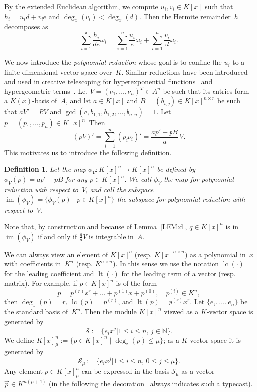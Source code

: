 \documentclass{sig-alternate-05-2015}
\newtheorem{defi}[theorem]{Definition}
\newcommand{\bN}{ {\mathbb N}}
\newcommand{\cS}{ {\mathcal S}}
\def\lc{\operatorname{lc}}
\def\lt{\operatorname{lt}}
\def\im{\operatorname{im}}
\begin{document}
By the extended Euclidean algorithm, we compute $u_i, v_i\in K[x]$ such that
$h_i = u_i d + v_i e$ and $\deg_x(v_i) < \deg_x(d)$. Then the Hermite remainder~$h$
decomposes as
\begin{equation}\label{EQ:h}
  \sum_{i=1}^n \frac{h_i}{de}\omega_i =  \sum_{i=1}^n \frac{u_i}{e}\omega_i + \sum_{i=1}^n \frac{v_i}{d}\omega_i.
\end{equation}

We now introduce the \emph{polynomial reduction} whose goal is to confine the $u_i$ to a finite-dimensional
vector space over~$K$. Similar reductions have been introduced and used in creative telescoping
for hyperexponential functions~\cite{bostan13a} and hypergeometric terms~\cite{chen15a}.
Let $V = (\nu_1, \ldots, \nu_n)^T\in A^n$ be such that its entries form a $K(x)$-basis of~$A$,
and let $a\in K[x]$ and $B = (b_{i, j})\in K[x]^{n \times n}$ be such that $aV'=BV$ and
$\gcd(a, b_{1, 1}, b_{1, 2}, \ldots, b_{n ,n})=1$. Let $p = (p_1, \ldots, p_n)\in K[x]^n$. Then
\begin{equation} \label{EQ:polyred}
  (pV)' = \sum_{i=1}^n (p_i \nu_i)' = \frac{ap' + pB}{a}\, V.
\end{equation}
This motivates us to introduce the following definition.
\begin{defi}
Let the map $\phi_V\colon K[x]^n \rightarrow K[x]^n$
be defined by $\phi_V(p) = ap' + pB$ for any $p\in K[x]^n$.
We call $\phi_V$ the \emph{map for polynomial reduction} with respect to~$V$, and call
the subspace $\im(\phi_V) = \{\phi_V(p) \mid p \in K[x]^n\}$
the \emph{subspace for polynomial reduction} with respect to~$V$.
\end{defi}

Note that, by construction and because of Lemma~\ref{LEM:d}, $q\in K[x]^n$ is in
$\im(\phi_V)$ if and only if $\frac{q}{a}V$ is integrable in~$A$.

We can always view an element of $K[x]^n$ (resp. $K[x]^{n\times n}$) as a polynomial in~$x$
with coefficients in~$K^n$ (resp. $K^{n\times n}$). In this sense we use the notation $\lc(\cdot)$
for the leading coefficient and $\lt(\cdot)$ for the leading term of a vector (resp. matrix).
For example, if $p\in K[x]^n$ is of the form
\[
  p = p^{(r)}x^r + \dots + p^{(1)}x + p^{(0)},\quad p^{(i)}\in K^n,
\]
then $\deg_x(p)=r$, $\lc(p)=p^{(r)}$, and $\lt(p)=p^{(r)}x^r$.
Let $\{e_1, \ldots, e_n\}$ be the standard basis of~$K^n$.
Then the module $K[x]^n$ viewed as a $K$-vector space is generated by
\[
  \cS := \bigl\{e_ix^j \mathrel{\big|} 1\leq i \leq n,\, j\in \bN\bigr\}.
\]
We define $K[x]_\mu^n:=\{p\in K[x]^n \mid \deg_x(p) \leq \mu\}$; as a $K$-vector
space it is generated by
\[
  \cS_\mu := \bigl\{e_ix^j \mathrel{\big|} 1\leq i \leq n,\, 0\leq j\leq \mu\bigr\}.
\]
Any element $p\in K[x]_\mu^n$ can be expressed in the
basis $\cS_\mu$ as a vector $\vec{p}\in K^{n(\mu+1)}$ (in the following the
decoration~\raisebox{-1pt}{$\vec{}\;$} always indicates such a typecast).
\end{document}

